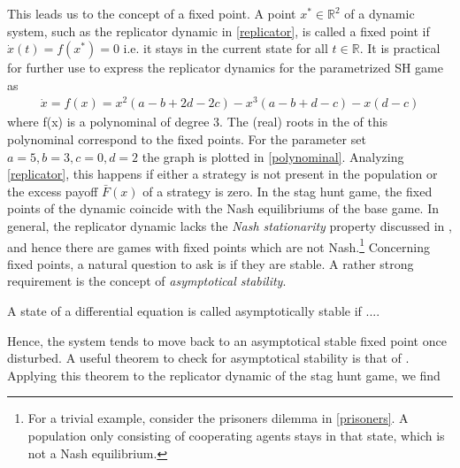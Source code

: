 \documentclass[12pt]{article}
\newcommand{\realnumb}{\mathbb{R}}
\begin{document}
This leads us to the concept of a fixed point. A point $x^* \in \realnumb^2$ of a dynamic system,
such as the replicator dynamic in \eqref{replicator}, is called a fixed point
if $\dot{x}(t) = f(x^*) = 0$ i.e. it stays in the current state for all $t \in 
\realnumb$. 
It is practical for further use to express the replicator dynamics for the
parametrized SH game as 
\begin{align}
        \dot{x} = f(x) = x^2(a-b+2d-2c) - x^3(a-b+d-c) -x(d-c) 
\end{align}
where f(x) is a polynominal of degree $3$. The (real) roots in the 
of this polynominal correspond to the fixed points. 
For the parameter set $a=5, b=3, c=0, d=2$  the graph is plotted in \ref{polynominal}.
Analyzing \eqref{replicator}, this happens if either a strategy
is not present in the population or the excess payoff $\bar{F}(x)$
of a strategy is zero. In the stag hunt game, the fixed points of the
dynamic coincide with the Nash equilibriums of the base game. In general, 
the replicator dynamic lacks the \textit{Nash stationarity} property discussed
in \cite{sandholm}, and hence there are games with fixed points which are not
Nash.\footnote{For a trivial example, consider the prisoners dilemma in 
\ref{prisoners}. A population only consisting of cooperating agents stays in
that state, which is not a Nash equilibrium.} 
Concerning fixed points, a natural question to ask is if they are stable. 
A rather strong requirement is the concept of \textit{asymptotical stability}.
\begin{mydef}
        A state of a differential equation is called asymptotically stable
        if ....
\end{mydef}
Hence, the system tends to move back to an asymptotical stable fixed point
once disturbed. 
A useful theorem to check for asymptotical stability is that 
of \cite{hartmanngrobman}. 
Applying this theorem to the replicator dynamic of the stag hunt game, we find
\end{document}
